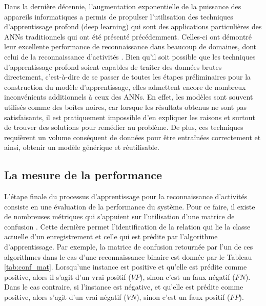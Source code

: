 Dans la dernière décennie, l'augmentation exponentielle de la puissance des appareils informatiques a permis de propulser l'utilisation des techniques d'apprentissage profond (deep learning) qui sont des applications particulières des \acsp{ANN} traditionnels qui ont été présenté précédemment. Celles-ci ont démontré leur excellente performance de reconnaissance dans beaucoup de domaines, dont celui de la reconnaissance d'activités \citep{Yang2015, Li2016, Wang2018}. Bien qu'il soit possible que les techniques d'apprentissage profond soient capables de traiter des données brutes directement, c'est-à-dire de se passer de toutes les étapes préliminaires pour la construction du modèle d'apprentissage, elles admettent encore de nombreux inconvénients additionnels à ceux des \acsp{ANN}. En effet, les modèles sont souvent utilisés comme des boîtes noires, car lorsque les résultats obtenus ne sont pas satisfaisants, il est pratiquement impossible d'en expliquer les raisons et surtout de trouver des solutions pour remédier au problème. De plus, ces techniques requièrent un volume conséquent de données pour être entraînées correctement et ainsi, obtenir un modèle générique et réutilisable.

\subsection{La mesure de la performance}

L'étape finale du processus d'apprentissage pour la reconnaissance d'activités consiste en une évaluation de la performance du système. Pour ce faire, il existe de nombreuses métriques qui s'appuient sur l'utilisation d'une matrice de confusion \citep{Fawcett2006}. Cette dernière permet l'identification de la relation qui lie la classe actuelle d'un enregistrement et celle qui est prédite par l'algorithme d'apprentissage. Par exemple, la matrice de confusion retournée par l'un de ces algorithmes dans le cas d'une reconnaissance binaire est donnée par le Tableau \ref{tab:conf_mat}. Lorsqu'une instance est positive et qu'elle est prédite comme positive, alors il s'agit d'un vrai positif ($VP$), sinon c'est un faux négatif ($FN$). Dans le cas contraire, si l'instance est négative, et qu'elle est prédite comme positive, alors s'agit d'un vrai négatif ($VN$), sinon c'est un faux positif ($FP$).

